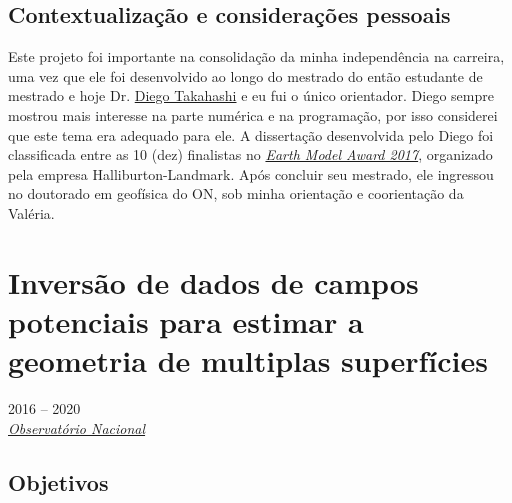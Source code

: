 \subsection*{Contextualização e considerações pessoais}
\label{subsec:proeto-diego-consideracoes}

Este projeto foi importante na consolidação da minha independência na carreira,
uma vez que ele foi desenvolvido ao longo do mestrado do então estudante de mestrado e
hoje Dr. \href{https://lattes.cnpq.br/4939493474727725}{Diego Takahashi} e eu fui o
único orientador.
Diego sempre mostrou mais interesse na parte numérica e na programação, por isso 
considerei que este tema era adequado para ele.
A dissertação desenvolvida pelo Diego foi classificada entre as 10 (dez) finalistas no 
\href{https://www.geolsoc.org.uk/Education-and-Careers/Grants/Earth-Model-Award}{\textit{Earth Model Award 2017}}, organizado pela empresa Halliburton-Landmark.
Após concluir seu mestrado, ele ingressou no doutorado em geofísica do ON, sob minha
orientação e coorientação da Valéria.


\section{Inversão de dados de campos potenciais para estimar a geometria de multiplas superfícies} 
\label{sec:projeto-Marcela}

 2016 -- 2020
\vspace{0.3\baselineskip}\\
 \href{https://www.gov.br/observatorio/pt-br}{\textsl{Observatório Nacional}}
\parbox{0.03\textwidth}{\vspace{-0.2\baselineskip} \hfill {}}

\subsection*{Objetivos}

